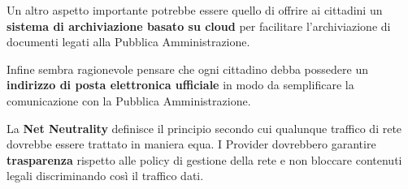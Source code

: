 Un altro aspetto importante potrebbe essere quello di offrire ai cittadini un \textbf{sistema di archiviazione basato su cloud} per facilitare l'archiviazione di documenti legati alla Pubblica Amministrazione.

Infine sembra ragionevole pensare che ogni cittadino debba possedere un \textbf{indirizzo di posta elettronica ufficiale} in modo da semplificare la comunicazione con la Pubblica Amministrazione.

\bigbreak
La \textbf{Net Neutrality} definisce il principio secondo cui qualunque traffico di rete dovrebbe essere trattato in maniera equa. I Provider dovrebbero garantire \textbf{trasparenza} rispetto alle policy di gestione della rete e non bloccare contenuti legali discriminando così il traffico dati.